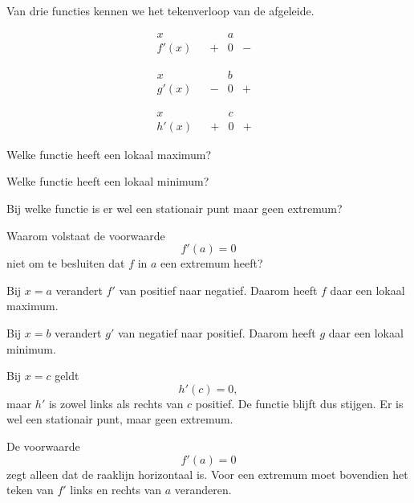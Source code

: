 \documentclass{ximera}
\begin{document}
\begin{oefening}{\oefB\ESS}

Van drie functies kennen we het tekenverloop van de afgeleide.

\[
\begin{array}{c|ccccc}
x      &      &   & a &   &      \\ \hline
f'(x)  &      & + & 0 & - &
\end{array}
\]

\[
\begin{array}{c|ccccc}
x      &      &   & b &   &      \\ \hline
g'(x)  &      & - & 0 & + &
\end{array}
\]

\[
\begin{array}{c|ccccc}
x      &      &   & c &   &      \\ \hline
h'(x)  &      & + & 0 & + &
\end{array}
\]

\begin{question}
Welke functie heeft een lokaal maximum?
\end{question}

\begin{question}
Welke functie heeft een lokaal minimum?
\end{question}

\begin{question}
Bij welke functie is er wel een stationair punt maar geen extremum?
\end{question}

\begin{question}
Waarom volstaat de voorwaarde
\[
f'(a)=0
\]
niet om te besluiten dat $f$ in $a$ een extremum heeft?
\end{question}

\begin{oplossing}

Bij $x=a$ verandert $f'$ van positief naar negatief. Daarom heeft $f$ daar
een lokaal maximum.

Bij $x=b$ verandert $g'$ van negatief naar positief. Daarom heeft $g$ daar
een lokaal minimum.

Bij $x=c$ geldt
\[
h'(c)=0,
\]
maar $h'$ is zowel links als rechts van $c$ positief. De functie blijft dus
stijgen. Er is wel een stationair punt, maar geen extremum.

De voorwaarde
\[
f'(a)=0
\]
zegt alleen dat de raaklijn horizontaal is. Voor een extremum moet bovendien
het teken van $f'$ links en rechts van $a$ veranderen.

\end{oplossing}

\end{oefening}
\end{document}
